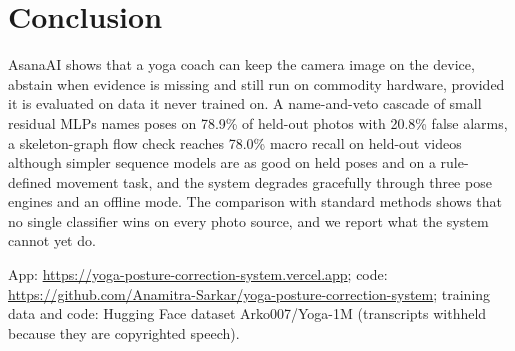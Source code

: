 \section{Conclusion}
AsanaAI shows that a yoga coach can keep the camera image on the device, abstain when evidence is missing and still run on commodity hardware, provided it is evaluated on data it never trained on. A name-and-veto cascade of small residual MLPs names poses on 78.9\% of held-out photos with 20.8\% false alarms, a skeleton-graph flow check reaches 78.0\% macro recall on held-out videos although simpler sequence models are as good on held poses and on a rule-defined movement task, and the system degrades gracefully through three pose engines and an offline mode. The comparison with standard methods shows that no single classifier wins on every photo source, and we report what the system cannot yet do.

 App: \url{https://yoga-posture-correction-system.vercel.app}; code: \url{https://github.com/Anamitra-Sarkar/yoga-posture-correction-system}; training data and code: Hugging Face dataset Arko007/Yoga-1M (transcripts withheld because they are copyrighted speech).
